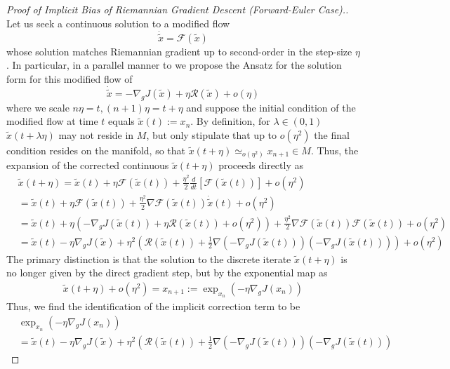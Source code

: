\documentclass[reqno,11pt,letterpaper]{amsart}
\theoremstyle{plain}
\theoremstyle{definition}
\theoremstyle{remark}
\newcommand{\rgrad}{\nabla_{\!g}}
\newcommand{\Fimp}{\mathcal{R}}
\begin{document}
\begin{proof}[Proof of Implicit Bias of Riemannian Gradient Descent (Forward-Euler Case).]
Let us seek a continuous solution to a modified flow
\[
\Dot{\tilde{x}} = \mathcal{F}(\tilde{x})
\]
whose solution matches Riemannian gradient up to second-order in the step-size $\eta$. In particular, in a parallel manner to \cite{barrett2021implicit} we propose the Ansatz for the solution form for this modified flow of
\[
\Dot{\tilde{x}} = -\rgrad J (\tilde{x}) + \eta \Fimp (\tilde{x}) + o(\eta)
\]
where we scale $n \eta = t, (n+1)\eta = t+\eta$ and suppose the initial condition of the modified flow at time $t$ equals $\tilde{x}(t) :=x_{n}$. By definition, for $\lambda \in (0,1)$ $\tilde{x}(t+\lambda \eta)$ may not reside in $M$, but only stipulate that up to $o(\eta^{2})$ the final condition resides on the manifold, so that $\tilde{x}(t+\eta) \simeq_{o(\eta^{2})} x_{n+1} \in M$. Thus, the expansion of the corrected continuous $\tilde{x}(t + \eta)$ proceeds directly as
\begin{align*}
    & \tilde{x}(t + \eta) = \tilde{x}(t) + \eta \mathcal{F} (\tilde{x}(t)) + \frac{\eta^{2}}{2} \frac{d}{ d t} \left[ \mathcal{F} (\tilde{x}(t)) \right] + o(\eta^{2}) \\
    & = \tilde{x}(t) + \eta \mathcal{F} (\tilde{x}(t)) + \frac{\eta^{2}}{2} \nabla \mathcal{F} (\tilde{x}(t)) \Dot{\tilde{x}}(t) + o(\eta^{2}) \\
    &= \tilde{x}(t) + \eta \left( -\rgrad J (\tilde{x}(t)) + \eta \Fimp (\tilde{x}(t)) + o(\eta^{2}) \right) + \frac{\eta^{2}}{2} \nabla \mathcal{F} (\tilde{x}(t)) \mathcal{F} (\tilde{x}(t)) + o(\eta^{2}) \\
    &= \tilde{x}(t) - \eta \rgrad J (\tilde{x}) + \eta^{2} \left( \Fimp (\tilde{x}(t)) + \frac{1}{2} \nabla (-\rgrad J(\tilde{x}(t))) (- \rgrad J(\tilde{x}(t)))
    \right) + o(\eta^{2})
\end{align*}
The primary distinction is that the solution to the discrete iterate $\tilde{x}(t + \eta)$ is no longer given by the direct gradient step, but by the exponential map as
\begin{align*}
    \tilde{x}(t+\eta) + o(\eta^{2}) = x_{n+1} := \exp_{x_{n}} (- \eta \rgrad J (x_{n}))
\end{align*}
Thus, we find the identification of the implicit correction term to be
\begin{align*}
     &\exp_{x_{n}} (- \eta \rgrad J (x_{n})) 
     \\ &= \tilde{x}(t) - \eta \rgrad J (\tilde{x}) + \eta^{2} \left( \Fimp (\tilde{x}(t)) + \frac{1}{2} \nabla (-\rgrad J(\tilde{x}(t))) (- \rgrad J(\tilde{x}(t)))

\end{align*}
\end{proof}
\end{document}
